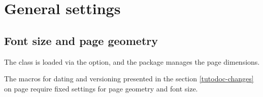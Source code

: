 \documentclass{tutodoc}
\begin{document}
\section{General settings}

\subsection{Font size and page geometry}

The  class is loaded via the  option, and the  package manages the page dimensions.


\begin{tdocwarn}
	The macros for dating and versioning presented in the section \ref{tutodoc-changes} on page \pageref{tutodoc-changes} require fixed settings for page geometry and font size.
\end{tdocwarn}
\end{document}
